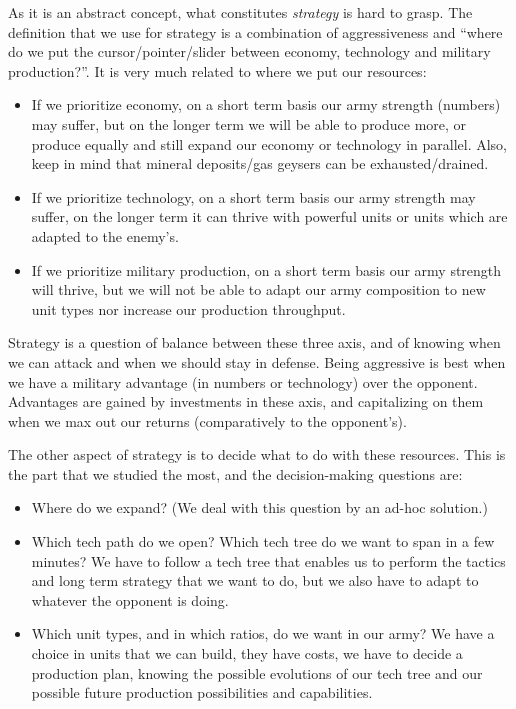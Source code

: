 As it is an abstract concept, what constitutes \textit{strategy} is hard to grasp. The definition that we use for strategy is a combination of aggressiveness and ``where do we put the cursor/pointer/slider between economy, technology and military production?''. It is very much related to where we put our resources:
\begin{itemize}
    \item If we prioritize economy, on a short term basis our army strength (numbers) may suffer, but on the longer term we will be able to produce more, or produce equally and still expand our economy or technology in parallel. Also, keep in mind that mineral deposits/gas geysers can be exhausted/drained.
    \item If we prioritize technology, on a short term basis our army strength may suffer, on the longer term it can thrive with powerful units or units which are adapted to the enemy's.
    \item If we prioritize military production, on a short term basis our army strength will thrive, but we will not be able to adapt our army composition to new unit types nor increase our production throughput.
\end{itemize}
Strategy is a question of balance between these three axis, and of knowing when we can attack and when we should stay in defense. Being aggressive is best when we have a military advantage (in numbers or technology) over the opponent. Advantages are gained by investments in these axis, and capitalizing on them when we max out our returns (comparatively to the opponent's).

The other aspect of strategy is to decide what to do with these resources. This is the part that we studied the most, and the decision-making questions are:
\begin{itemize}
    \item Where do we expand? (We deal with this question by an ad-hoc solution.)
    \item Which tech path do we open? Which tech tree do we want to span in a few minutes? We have to follow a tech tree that enables us to perform the tactics and long term strategy that we want to do, but we also have to adapt to whatever the opponent is doing.
    \item Which unit types, and in which ratios, do we want in our army? We have a choice in units that we can build, they have costs, we have to decide a production plan, knowing the possible evolutions of our tech tree and our possible future production possibilities and capabilities.
\end{itemize}

